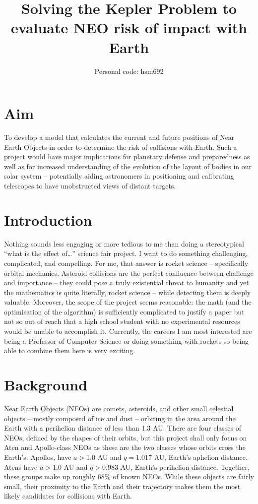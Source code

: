 \documentclass[12pt]{article}
\title{Solving the Kepler Problem to evaluate NEO risk of impact with Earth}
\author{Personal code: hsm692}
\date{\vspace{-5ex}}
\begin{document}
\maketitle

\section{Aim}
To develop a model that calculates the current and future positions of Near Earth Objects in order to determine the risk of collisions with Earth. Such a project would have major implications for planetary defense and preparedness as well as for increased understanding of the evolution of the layout of bodies in our solar system -- potentially aiding astronomers in positioning and calibrating telescopes to have unobstructed views of distant targets. 

\section{Introduction}
Nothing sounds less engaging or more tedious to me than doing a stereotypical “what is the effect of…” science fair project. I want to do something challenging, complicated, and compelling. For me, that answer is rocket science -- specifically orbital mechanics. Asteroid collisions are the perfect confluence between challenge and importance -- they could pose a truly existential threat to humanity and yet the mathematics is quite literally, rocket science -- while detecting them is deeply valuable. Moreover, the scope of the project seems reasonable: the math (and the optimisation of the algorithm) is sufficiently complicated to justify a paper but not so out of reach that a high school student with no experimental resources would be unable to accomplish it. Currently, the careers I am most interested are being a Professor of Computer Science or doing something with rockets so being able to combine them here is very exciting. 

\section{Background}
Near Earth Objects (NEOs) are comets, asteroids, and other small celestial objects -- mostly composed of ice and dust -- orbiting in the area around the Earth with a perihelion distance of less than 1.3 AU. There are four classes of NEOs, defined by the shapes of their orbits, but this project shall only focus on Aten and Apollo-class NEOs as these are the two classes whose orbits cross the Earth's. Apollos, have $a > 1.0$ AU and $q = 1.017$ AU, Earth's aphelion distance. Atens have $a > 1.0$ AU and $q > 0.983$ AU, Earth's perihelion distance. Together, these groups make up roughly 68\% of known NEOs. While these objects are fairly small, their proximity to the Earth and their trajectory makes them the most likely candidates for collisions with Earth. 
\end{document}
